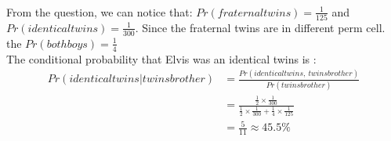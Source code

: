 \documentclass[11pt]{article}
\begin{document}
  \paragraph{\color{red}{Question Two Answer:}}
  From the question, we can notice that: $Pr(fraternal twins) = \frac{1}{125}$ and $Pr(identical twins) = \frac{1}{300}$. Since the fraternal twins are in different perm cell. the $Pr(both boys) = \frac{1}{4}$\\
  The conditional probability that Elvis was an identical twins is :
  \begin{align*}
    Pr(identical twins | twins brother) &= \frac{Pr(identical twins, \ twins brother)}{Pr(twins brother)} \\
    &= \frac{\frac{1}{2} \times \frac{1}{300}}{\frac{1}{2} \times \frac{1}{300} + \frac{1}{4}\times \frac{1}{125}} \\
    &= \frac{5}{11} \approx 45.5\%
  \end{align*}
  \\
  \\
\end{document}
